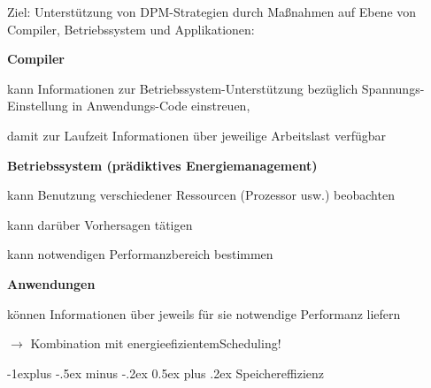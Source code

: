 \documentclass[a4paper]{article}
\makeatletter
\renewcommand{\subsection}{\@startsection{subsection}{2}{0mm}%
 {-1explus -.5ex minus -.2ex}%
 {0.5ex plus .2ex}%
 {\normalfont\normalsize\bfseries}}
\makeatother
\begin{document}
\begin{multicols}{3}
    \begin{itemize*}
        \item
        Ziel: Unterstützung von DPM-Strategien durch Maßnahmen auf Ebene von
        Compiler, Betriebssystem und Applikationen:
        \begin{itemize*}
            \item \textbf{Compiler} \begin{itemize*} \item kann Informationen zur Betriebssystem-Unterstützung bezüglich Spannungs-Einstellung in Anwendungs-Code einstreuen, \item damit zur Laufzeit Informationen über jeweilige Arbeitslast verfügbar \end{itemize*}
        \end{itemize*}
        \item
        \textbf{Betriebssystem (prädiktives Energiemanagement)}
        \begin{itemize*}
            \item kann Benutzung verschiedener Ressourcen (Prozessor usw.) beobachten
            \item kann darüber Vorhersagen tätigen
            \item kann notwendigen Performanzbereich bestimmen
        \end{itemize*}
        \item
        \textbf{Anwendungen}
        \begin{itemize*}
            \item können Informationen über jeweils für sie notwendige Performanz liefern
        \end{itemize*}
        \item
        $\rightarrow$ Kombination mit
        energieefizientemScheduling!
    \end{itemize*}


    \subsection{Speichereffizienz}


\end{multicols}
\end{document}
